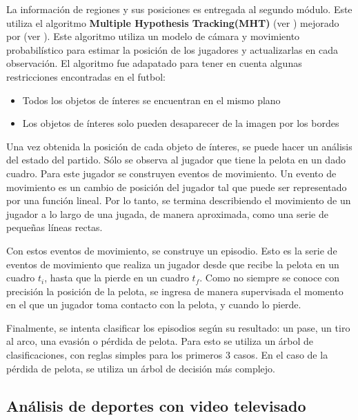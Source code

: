 \documentclass[a4paper,10pt]{article}
\begin{document}
La información de regiones y sus posiciones es entregada al segundo módulo.
Este utiliza el algoritmo \textbf{Multiple Hypothesis Tracking(MHT)} (ver \cite{MHT-1, MHT-2}) mejorado por
\citeauthor*{Schmitt-1} (ver \cite{Schmitt-2}). Este algoritmo utiliza un modelo de cámara y movimiento
probabilístico para estimar la posición de los jugadores y actualizarlas en cada observación.
El algoritmo fue adapatado para tener en cuenta algunas restricciones encontradas en el futbol:
\begin{itemize}
\item Todos los objetos de ínteres se encuentran en el mismo plano
\item Los objetos de ínteres solo pueden desaparecer de la imagen por los bordes
\end{itemize}

Una vez obtenida la posición de cada objeto de ínteres, se puede hacer un análisis del estado del partido.
Sólo se observa al jugador que tiene la pelota en un dado cuadro.
Para este jugador se construyen eventos de movimiento. Un evento de movimiento es un cambio de posición del jugador
tal que puede ser representado por una función lineal. Por lo tanto, se termina describiendo el movimiento de un
jugador a lo largo de una jugada, de manera aproximada, como una serie de pequeñas líneas rectas.

Con estos eventos de movimiento, se construye un episodio. Esto es la serie de eventos de movimiento que realiza
un jugador desde que recibe la pelota en un cuadro $t_i$, hasta que la pierde en un cuadro $t_f$.
Como no siempre se conoce con precisión la posición de la pelota, se ingresa de manera supervisada el momento en el
que un jugador toma contacto con la pelota, y cuando lo pierde.

Finalmente, se intenta clasificar los episodios según su resultado: un pase, un tiro al arco, una evasión o pérdida de pelota.
Para esto se utiliza un árbol de clasificaciones, con reglas simples para los primeros 3 casos.
En el caso de la pérdida de pelota, se utiliza un árbol de decisión más complejo.

\subsection{Análisis de deportes con video televisado}
\label{sec:tv-video}

\subsubsection{}
\end{document}
